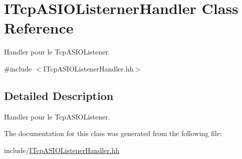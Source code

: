 \hypertarget{class_i_tcp_a_s_i_o_listerner_handler}{\section{I\-Tcp\-A\-S\-I\-O\-Listerner\-Handler Class Reference}
\label{class_i_tcp_a_s_i_o_listerner_handler}
}


Handler pour le Tcp\-A\-S\-I\-O\-Listener.  




{\ttfamily \#include $<$I\-Tcp\-A\-S\-I\-O\-Listener\-Handler.\-hh$>$}



\subsection{Detailed Description}
Handler pour le Tcp\-A\-S\-I\-O\-Listener. 

The documentation for this class was generated from the following file\-:\begin{DoxyCompactItemize}
\item 
include/\hyperlink{_i_tcp_a_s_i_o_listener_handler_8hh}{I\-Tcp\-A\-S\-I\-O\-Listener\-Handler.\-hh}\end{DoxyCompactItemize}
